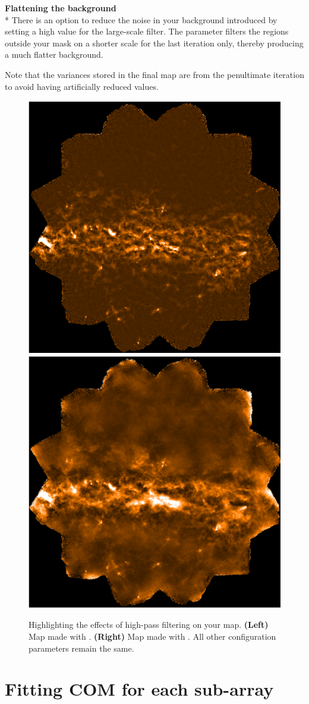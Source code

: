 \textbf{Flattening the background}\\*
There is an option to reduce the noise in your background introduced by
setting a high value for the large-scale filter. The parameter
 filters the regions outside
your  mask on a shorter scale for the last iteration only,
thereby producing a much flatter background.

Note that the variances stored in the final map are from the penultimate
iteration to avoid having artificially reduced values.


\begin{figure}
\includegraphics[width=0.46\linewidth]{sc21_brex_19}
\hspace{7mm}
\includegraphics[width=0.46\linewidth]{sc21_brex_18}
\caption[Illustrating the effects of high-pass filtering]{
  Highlighting the effects of high-pass filtering on your map.
  \textbf{(Left)} Map made with .
  \textbf{(Right)} Map made with .
  All other configuration parameters remain the same.\label{fig:fltcompare}
}
\end{figure}


\section{Fitting COM for each sub-array}
\label{sec:fitcom}

